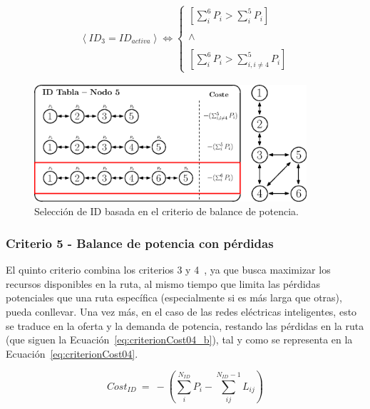 \begin{equation}\label{eq:criterionCost03_b}
\begin{split}
     \left \langle ID_{3} = ID_{activa} \right \rangle \Leftrightarrow
     \left\{\begin{matrix}
     [\sum_{i}^{6}P_{i} > \sum_{i}^{5}P_{i}]\\
       \\
       \wedge \\ 
       \\
       [\sum_{i}^{6}P_{i} > \sum_{i,i\neq 4}^{5}P_{i}]
     \end{matrix}\right.
\end{split}
\end{equation}
\begin{figure}[ht!]
    \centering
    \includegraphics[width=0.9\textwidth]{fig/05_den2ne/den2ne_08.eps}
    \caption{Selección de ID basada en el criterio de balance de potencia.}
    \label{fig:den2ne_08}
\end{figure}

\subsubsection{Criterio 5 - Balance de potencia con pérdidas}

El quinto criterio combina los criterios 3 y 4~\cite{Schneider17,Ma97}, ya que busca maximizar los recursos disponibles en la ruta, al mismo tiempo que limita las pérdidas potenciales que una ruta específica (especialmente si es más larga que otras), pueda conllevar. Una vez más, en el caso de las redes eléctricas inteligentes, esto se traduce en la oferta y la demanda de potencia, restando las pérdidas en la ruta (que siguen la Ecuación~\ref{eq:criterionCost04_b}), tal y como se representa en la Ecuación~\ref{eq:criterionCost04}.  
 

\begin{equation}\label{eq:criterionCost04}
     Cost_{ID}  \: = \: -(\sum_{i}^{N_{ID}} P_{i} - \sum_{ij}^{N_{ID}-1} L_{ij})
\end{equation}
\vspace{0.2cm}

